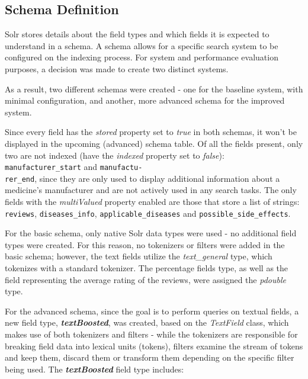 \documentclass[sigconf]{acmart}
\begin{document}
\subsection{Schema Definition}

Solr stores details about the field types and which fields it is expected to understand in a schema. A schema allows for a specific search system to be configured on the indexing process. For system and performance evaluation purposes, a decision was made to create two distinct systems.

As a result, two different schemas were created - one for the baseline system, with minimal configuration, and another, more advanced schema for the improved system. 

Since every field has the \textit{stored} property set to \textit{true} in both schemas, it won't be displayed in the upcoming (advanced) schema table. Of all the fields present, only two are not indexed (have the \textit{indexed} property set to \textit{false}): \texttt{manufacturer\_start} and \texttt{manufactu-\\rer\_end}, since they are only used to display additional information about a medicine's manufacturer and are not actively used in any search tasks. The only fields with the \textit{multiValued} property enabled are those that store a list of strings: \texttt{reviews}, \texttt{diseases\_info}, \texttt{applicable\_diseases} and \texttt{possible\_side\_effects}.

For the basic schema, only native Solr data types were used - no additional field types were created. For this reason, no tokenizers\cite{tokenizer} or filters\cite{filters} were added in the basic schema; however, the text fields utilize the \textit{text\_general} type, which tokenizes with a standard tokenizer. The percentage fields type, as well as the field representing the average rating of the reviews, were assigned the \textit{pdouble} type.

For the advanced schema, since the goal is to perform queries on textual fields, a new field type, \textbf{\textit{textBoosted}}, was created, based on the \textit{TextField} class, which makes use of both tokenizers and filters - while the tokenizers are responsible for breaking field data into lexical units (tokens), filters examine the stream of tokens and keep them, discard them or transform them depending on the specific filter being used. The \textbf{\textit{textBoosted}} field type includes: 
\end{document}
